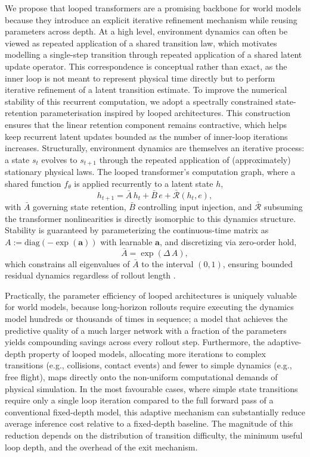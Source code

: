 \documentclass{article} %
\begin{document}
We propose that looped transformers are a promising backbone for world models because they introduce an explicit iterative refinement mechanism while reusing parameters across depth. At a high level, environment dynamics can often be viewed as repeated application of a shared transition law, which motivates modelling a single-step transition through repeated application of a shared latent update operator. This correspondence is conceptual rather than exact, as the inner loop is not meant to represent physical time directly but to perform iterative refinement of a latent transition estimate. To improve the numerical stability of this recurrent computation, we adopt a spectrally constrained state-retention parameterisation inspired by looped architectures. This construction ensures that the linear retention component remains contractive, which helps keep recurrent latent updates bounded as the number of inner-loop iterations increases. Structurally, environment dynamics are themselves an iterative process: a state $s_t$ evolves to $s_{t+1}$ through the repeated application of (approximately) stationary physical laws. The looped transformer's computation graph, where a shared function $f_\theta$ is applied recurrently to a latent state $h$,
\begin{equation}
  h_{t+1} = \bar{A}\, h_t + \bar{B}\, e + \bar{\mathcal{R}}(h_t, e),
  \label{eq:looped_update}
\end{equation} 
with $\bar{A}$ governing state retention, $\bar{B}$ controlling input injection, and $\bar{\mathcal{R}}$ subsuming the transformer nonlinearities \citep{prairie2026parcae} is directly isomorphic to this dynamics structure. Stability is guaranteed by parameterizing the continuous-time matrix as $A := \mathrm{diag}(-\exp(\mathbf{a}))$ with learnable $\mathbf{a}$, and discretizing via zero-order hold,
\begin{equation}
  \bar{A} = \exp(\Delta\, A),
  \label{eq:discretization}
\end{equation}
which constrains all eigenvalues of $\bar{A}$ to the interval $(0, 1)$, ensuring bounded residual dynamics regardless of rollout length
\citep{prairie2026parcae}.

Practically, the parameter efficiency of looped architectures is uniquely valuable for world models, because long-horizon rollouts require executing the dynamics model hundreds or thousands of times in sequence; a model that achieves the predictive quality of a much larger network with a fraction of the parameters yields compounding savings across every rollout step. Furthermore, the adaptive-depth property of looped models, allocating more iterations to complex transitions (e.g., collisions, contact events) and fewer to simple dynamics (e.g., free flight), maps directly onto the non-uniform computational demands of physical simulation. In the most favourable cases, where simple state transitions require only a single loop iteration compared to the full forward pass of a conventional fixed-depth model, this adaptive mechanism can substantially reduce average inference cost relative to a fixed-depth baseline. The magnitude of this reduction depends on the distribution of transition difficulty, the minimum useful loop depth, and the overhead of the exit mechanism.
\end{document}
